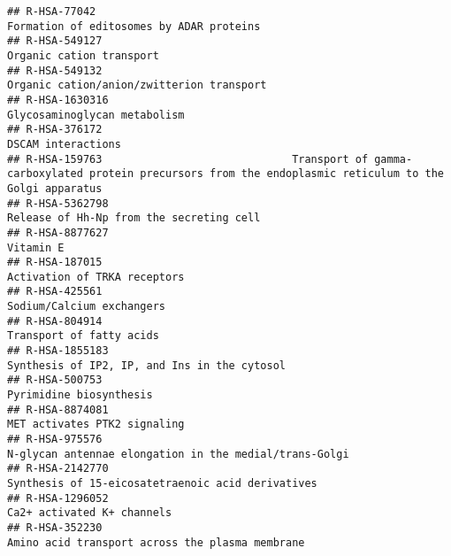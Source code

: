 \documentclass[
]{article}
\begin{document}
\begin{verbatim}
## R-HSA-77042                                                                                               Formation of editosomes by ADAR proteins
## R-HSA-549127                                                                                                              Organic cation transport
## R-HSA-549132                                                                                             Organic cation/anion/zwitterion transport
## R-HSA-1630316                                                                                                         Glycosaminoglycan metabolism
## R-HSA-376172                                                                                                                    DSCAM interactions
## R-HSA-159763                              Transport of gamma-carboxylated protein precursors from the endoplasmic reticulum to the Golgi apparatus
## R-HSA-5362798                                                                                             Release of Hh-Np from the secreting cell
## R-HSA-8877627                                                                                                                            Vitamin E
## R-HSA-187015                                                                                                          Activation of TRKA receptors
## R-HSA-425561                                                                                                             Sodium/Calcium exchangers
## R-HSA-804914                                                                                                              Transport of fatty acids
## R-HSA-1855183                                                                                         Synthesis of IP2, IP, and Ins in the cytosol
## R-HSA-500753                                                                                                               Pyrimidine biosynthesis
## R-HSA-8874081                                                                                                         MET activates PTK2 signaling
## R-HSA-975576                                                                                N-glycan antennae elongation in the medial/trans-Golgi
## R-HSA-2142770                                                                                    Synthesis of 15-eicosatetraenoic acid derivatives
## R-HSA-1296052                                                                                                           Ca2+ activated K+ channels
## R-HSA-352230                                                                                       Amino acid transport across the plasma membrane

\end{verbatim}
\end{document}
